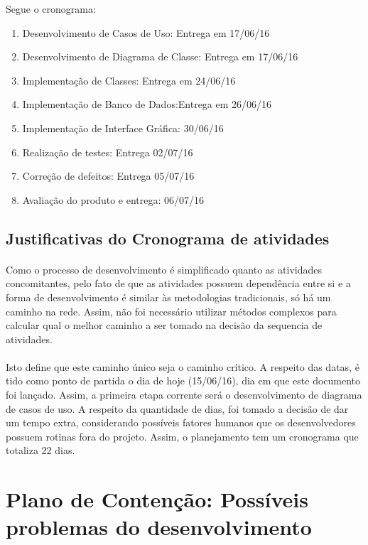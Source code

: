 \documentclass[12pt,a4paper]{article}
\begin{document}
		Segue o cronograma: 
		
		\begin{enumerate}
			\item Desenvolvimento de Casos de Uso: Entrega em 17/06/16
			\item Desenvolvimento de Diagrama de Classe: Entrega em 17/06/16
			\item Implementação de Classes: Entrega em 24/06/16
			\item Implementação de Banco de Dados:Entrega em 26/06/16
			\item Implementação de Interface Gráfica: 30/06/16
			\item Realização de testes: Entrega 02/07/16
			\item Correção de defeitos: Entrega 05/07/16
			\item Avaliação do produto e entrega: 06/07/16  
		\end{enumerate}
		
		\subsection{Justificativas do Cronograma de atividades}
		\paragraph{} Como o processo de desenvolvimento é simplificado quanto as atividades concomitantes, pelo fato de que as atividades possuem dependência entre si e a forma de desenvolvimento é similar às metodologias tradicionais, só há um caminho na rede. Assim, não foi necessário utilizar métodos complexos para calcular qual o melhor caminho a ser tomado na decisão da sequencia de atividades.
		\paragraph{}Isto define que este caminho único seja o caminho crítico. A respeito das datas, é tido como ponto de partida o dia de hoje (15/06/16), dia em que este documento foi lançado. Assim, a primeira etapa corrente será o desenvolvimento de diagrama de casos de uso. A respeito da quantidade de dias, foi tomado a decisão de dar um tempo extra, considerando possíveis fatores humanos que os desenvolvedores possuem rotinas fora do projeto.  Assim, o planejamento tem um cronograma que totaliza 22 dias. 
		\section{Plano de Contenção: Possíveis problemas do desenvolvimento}
\end{document}
